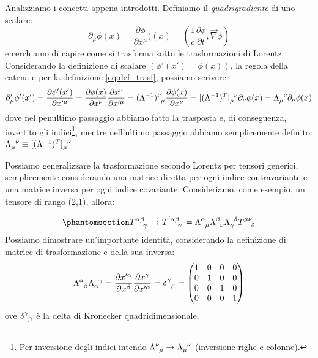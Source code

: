 Analizziamo i concetti appena introdotti. Definiamo il \textit{quadrigradiente} di uno scalare: 
\begin{equation}
\partial_\mu \phi(x)=
 \dfrac{\partial \phi}{\partial x^\mu}((x) = (\dfrac{1}{c}\dfrac{\partial \phi}{\partial t},\vec \nabla \phi)
\end{equation}
e cerchiamo di capire come si trasforma sotto le trasformazioni di Lorentz.
Considerando la definizione di scalare $(\phi'(x')=\phi(x))$, la regola della catena e per la definizione \eqref{eq:def_trasf}, possiamo scrivere:
\begin{equation*}
\partial_\mu' \phi'(x')=\dfrac{\partial \phi'(x')}{\partial x'^\mu}= \dfrac{\partial \phi(x)}{\partial x^\nu}\dfrac{\partial x^\nu}{\partial x'^\mu} = (\Lambda^{-1})\indices{^\nu_\mu}\dfrac{\partial \phi(x)}{\partial x^\nu}=[(\Lambda^{-1})^T]\indices{_\mu^\nu}\partial_\nu \phi(x)=\Lambda\indices{_\mu^\nu}\partial_\nu \phi(x)
\end{equation*}
 dove nel penultimo passaggio abbiamo fatto la trasposta e, di conseguenza, invertito gli indici\footnote{Per inversione degli indici intendo $\Lambda\indices{^\nu_\mu}\rightarrow \Lambda\indices{_\mu^\nu}$ (inversione righe e colonne).}, mentre nell'ultimo passaggio abbiamo semplicemente definito: $\Lambda\indices{_\mu^\nu}\equiv[(\Lambda^{-1})^T]\indices{_\mu^\nu}$.
 
Possiamo generalizzare la trasformazione secondo Lorentz per tensori generici, semplicemente considerando una matrice diretta per ogni indice contravariante e una matrice inversa per ogni indice covariante.
Consideriamo, come esempio, un tensore di rango (2,1), allora:

\begin{equation} \phantomsection\label{eq:tras_generic}
    T\indices{^{\alpha\beta}_\gamma}
    \rightarrow
    T\indices{^'^{\alpha\beta}_\gamma}
    =\Lambda\indices{^\alpha_\mu}
    \Lambda\indices{^\beta_\nu}
    \Lambda\indices{_\gamma^\delta}
    T\indices{^{\mu\nu}_\delta}
\end{equation}
Possiamo dimostrare un'importante identità, considerando la definizione di matrice di trasformazione e della sua inversa:
\begin{equation}\label{Eq:id_matri}
\Lambda\indices{^\alpha_\beta}\Lambda\indices{_\alpha^\gamma}=\dfrac{\partial x'^\alpha}{\partial x^\beta} \dfrac{\partial x^\gamma}{\partial x'^\alpha}=\delta\indices{^\gamma_\beta}=
\begin{pmatrix}
  1 & 0 & 0 & 0  \\
  0 & 1 & 0 & 0  \\
  0 & 0 & 1 & 0   \\
  0 & 0 & 0 & 1
\end{pmatrix}
\end{equation}
ove $\delta\indices{^\gamma_\beta}$ è la delta di Kronecker quadridimensionale.

